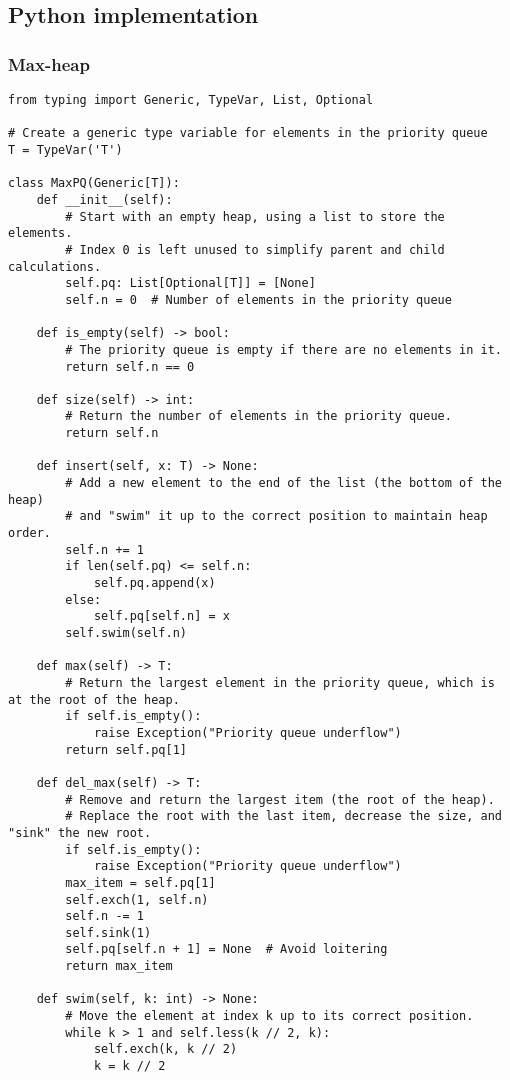 \documentclass{article}
\begin{document}
\subsection{Python implementation}

\subsubsection{Max-heap}

\begin{verbatim}
from typing import Generic, TypeVar, List, Optional

# Create a generic type variable for elements in the priority queue
T = TypeVar('T')

class MaxPQ(Generic[T]):
    def __init__(self):
        # Start with an empty heap, using a list to store the elements.
        # Index 0 is left unused to simplify parent and child calculations.
        self.pq: List[Optional[T]] = [None]
        self.n = 0  # Number of elements in the priority queue

    def is_empty(self) -> bool:
        # The priority queue is empty if there are no elements in it.
        return self.n == 0

    def size(self) -> int:
        # Return the number of elements in the priority queue.
        return self.n

    def insert(self, x: T) -> None:
        # Add a new element to the end of the list (the bottom of the heap)
        # and "swim" it up to the correct position to maintain heap order.
        self.n += 1
        if len(self.pq) <= self.n:
            self.pq.append(x)
        else:
            self.pq[self.n] = x
        self.swim(self.n)

    def max(self) -> T:
        # Return the largest element in the priority queue, which is at the root of the heap.
        if self.is_empty():
            raise Exception("Priority queue underflow")
        return self.pq[1]

    def del_max(self) -> T:
        # Remove and return the largest item (the root of the heap).
        # Replace the root with the last item, decrease the size, and "sink" the new root.
        if self.is_empty():
            raise Exception("Priority queue underflow")
        max_item = self.pq[1]
        self.exch(1, self.n)
        self.n -= 1
        self.sink(1)
        self.pq[self.n + 1] = None  # Avoid loitering
        return max_item

    def swim(self, k: int) -> None:
        # Move the element at index k up to its correct position.
        while k > 1 and self.less(k // 2, k):
            self.exch(k, k // 2)
            k = k // 2


\end{verbatim}
\end{document}
